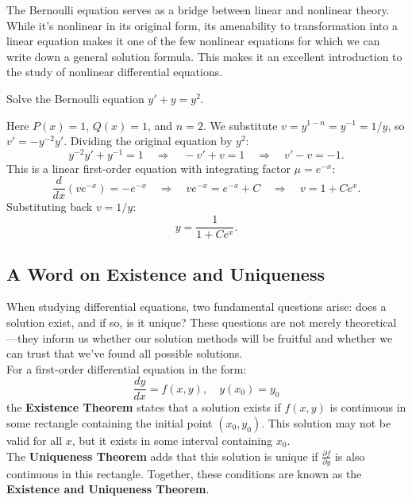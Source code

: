 \noindent The Bernoulli equation serves as a bridge between linear and nonlinear theory. While it's nonlinear in its original form, its amenability to transformation into a linear equation makes it one of the few nonlinear equations for which we can write down a general solution formula. This makes it an excellent introduction to the study of nonlinear differential equations.

\exampleline
\begin{example}
Solve the Bernoulli equation \( y' + y = y^2 \).

\begin{solution}
Here \( P(x) = 1 \), \( Q(x) = 1 \), and \( n = 2 \). We substitute \( v = y^{1-n} = y^{-1} = 1/y \), so \( v' = -y^{-2}y' \). Dividing the original equation by \( y^2 \):
\[ y^{-2}y' + y^{-1} = 1 \quad \Rightarrow \quad -v' + v = 1 \quad \Rightarrow \quad v' - v = -1. \]
This is a linear first-order equation with integrating factor \( \mu = e^{-x} \):
\[ \frac{d}{dx}(ve^{-x}) = -e^{-x} \quad \Rightarrow \quad ve^{-x} = e^{-x} + C \quad \Rightarrow \quad v = 1 + Ce^x. \]
Substituting back \( v = 1/y \):
\[ y = \frac{1}{1 + Ce^x}. \]
\end{solution}
\end{example}
\exampleline

\subsection*{A Word on Existence and Uniqueness} 

\noindent When studying differential equations, two fundamental questions arise: does a solution exist, and if so, is it unique? These questions are not merely theoretical—they inform us whether our solution methods will be fruitful and whether we can trust that we've found all possible solutions. \\

\noindent For a first-order differential equation in the form:
\[
\frac{dy}{dx} = f(x,y), \quad y(x_0) = y_0
\]
the \textbf{Existence Theorem}  states that a solution exists if $f(x,y)$ is continuous in some rectangle containing the initial point $(x_0, y_0)$. This solution may not be valid for all $x$, but it exists in some interval containing $x_0$. \\

\noindent The \textbf{Uniqueness Theorem}  adds that this solution is unique if $\frac{\partial f}{\partial y}$ is also continuous in this rectangle. Together, these conditions are known as the \textbf{Existence and Uniqueness Theorem}. \\

